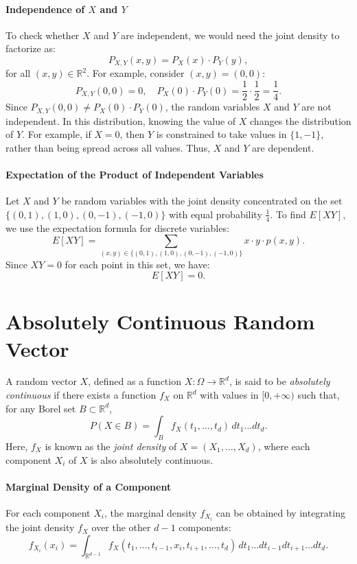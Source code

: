 \paragraph{Independence of \( X \) and \( Y \)}
To check whether \( X \) and \( Y \) are independent, we would need the joint density to factorize as:
\[
P_{X,Y}(x, y) = P_X(x) \cdot P_Y(y),
\]
for all \( (x, y) \in \mathbb{R}^2 \). \newline
For example, consider \( (x, y) = (0, 0) \):
\[
P_{X,Y}(0, 0) = 0, \quad P_X(0) \cdot P_Y(0) = \frac{1}{2} \cdot \frac{1}{2} = \frac{1}{4}.
\]
Since \( P_{X,Y}(0, 0) \neq P_X(0) \cdot P_Y(0) \), the random variables \( X \) and \( Y \) are not independent. \newline
In this distribution, knowing the value of \( X \) changes the distribution of \( Y \). For example, if \( X = 0 \), then \( Y \) is constrained to take values in \( \{1, -1\} \), rather than being spread across all values. Thus, \( X \) and \( Y \) are dependent.

\paragraph{Expectation of the Product of Independent Variables}
Let \(X\) and \(Y\) be random variables with the joint density concentrated on the set \( \{ (0,1), (1,0), (0,-1), (-1,0) \} \) with equal probability \( \frac{1}{4} \). \newline
To find \(E[XY]\), we use the expectation formula for discrete variables:
\[
E[XY] = \sum_{(x,y) \in \{ (0,1), (1,0), (0,-1), (-1,0) \}} x \cdot y \cdot p(x, y).
\]
Since \(XY = 0\) for each point in this set, we have:
\[
E[XY] = 0.
\]

\section{Absolutely Continuous Random Vector}
A random vector \( X \), defined as a function \( X: \Omega \rightarrow \mathbb{R}^d \), is said to be \textit{absolutely continuous} if there exists a function \( f_X \) on \( \mathbb{R}^d \) with values in \( [0, +\infty) \) such that, for any Borel set \( B \subset \mathbb{R}^d \),
\[
P(X \in B) = \int_B f_X(t_1, \dots, t_d) \, dt_1 \dots dt_d.
\]
Here, \( f_X \) is known as the \textit{joint density} of \( X = (X_1, \dots, X_d) \), where each component \( X_i \) of \( X \) is also absolutely continuous.

\paragraph{Marginal Density of a Component}
For each component \( X_i \), the marginal density \( f_{X_i} \) can be obtained by integrating the joint density \( f_X \) over the other \( d-1 \) components:
\[
f_{X_i}(x_i) = \int_{\mathbb{R}^{d-1}} f_X(t_1, \dots, t_{i-1}, x_i, t_{i+1}, \dots, t_d) \, dt_1 \dots dt_{i-1} dt_{i+1} \dots dt_d.
\]

